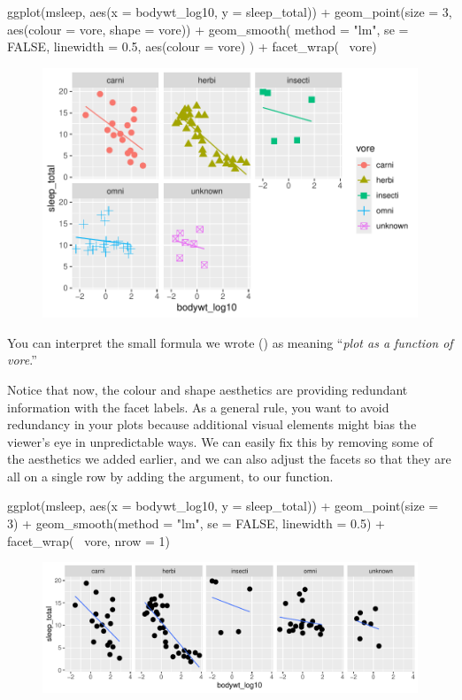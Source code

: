 \begin{inR}
ggplot(msleep, aes(x = bodywt_log10, y = sleep_total)) +
  geom_point(size = 3, aes(colour = vore, shape = vore)) +
  geom_smooth(
    method = "lm", 
    se = FALSE,
    linewidth = 0.5,
    aes(colour = vore)
  ) +
    facet_wrap(~ vore)
\end{inR}
\vspace{2em}
\begin{figure}[H]
\includegraphics[scale = 0.75]{graphics/ch2Figs/ggEx_14.pdf}
\end{figure}

You can interpret the small formula we wrote () as meaning ``\textit{plot as a function of vore}.''

Notice that now, the colour and shape aesthetics are providing redundant information with the facet labels. As a general rule, you want to avoid redundancy in your plots because additional visual elements might bias the viewer's eye in unpredictable ways. We can easily fix this by removing some of the aesthetics we added earlier, and we can also adjust the facets so that they are all on a single row by adding the argument,  to our  function.

\begin{inR}
ggplot(msleep, aes(x = bodywt_log10, y = sleep_total)) +
  geom_point(size = 3) +
  geom_smooth(method = "lm", se = FALSE, linewidth = 0.5) +
  facet_wrap(~ vore, nrow = 1)
\end{inR}

\vspace{2em}

\begin{figure}[H]
\includegraphics[scale = .75]{graphics/ch2Figs/ggEx_15.pdf}
\end{figure}

